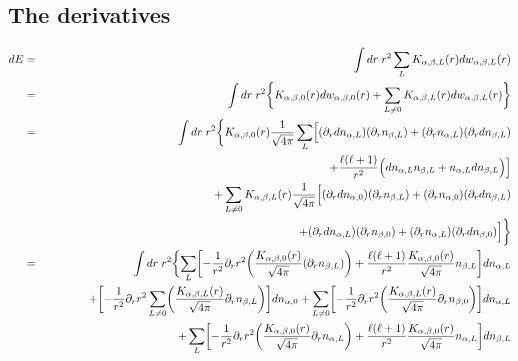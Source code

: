 \documentclass[11pt,a4paper]{report}
\begin{document}
\subsection{The derivatives}
\begin{eqnarray}
dE&=&\int dr\; r^2 \sum_LK_{\alpha,\beta,L}(r)dw_{\alpha,\beta,L}(r)
\nonumber\\
&=&\int dr\; r^2
\biggl\lbrace
 K_{\alpha,\beta,0}(r)dw_{\alpha,\beta,0}(r)
+\sum_{L\neq0} K_{\alpha,\beta,L}(r)dw_{\alpha,\beta,L}(r)
\biggr\rbrace
\nonumber\\
&=&\int dr\; r^2
\biggl\lbrace
 K_{\alpha,\beta,0}(r)\frac{1}{\sqrt{4\pi}}
\sum_L\Bigl[(\partial_r dn_{\alpha,L})(\partial_r n_{\beta,L})
+(\partial_r n_{\alpha,L})(\partial_r dn_{\beta,L})
\nonumber\\
&&\hspace{3cm}+\frac{\ell(\ell+1)}{r^2}
\Bigl(dn_{\alpha,L}n_{\beta,L}+n_{\alpha,L}dn_{\beta,L}\Bigr)
\Bigr]
\nonumber\\
&&+\sum_{L\neq0} K_{\alpha,\beta,L}(r)\frac{1}{\sqrt{4\pi}}
\Bigl[
(\partial_r dn_{\alpha,0})(\partial_r n_{\beta,L}) 
+(\partial_r n_{\alpha,0})(\partial_r dn_{\beta,L}) 
\nonumber\\
&&\hspace{3cm}+(\partial_r dn_{\alpha,L})(\partial_r n_{\beta,0}) 
+(\partial_r n_{\alpha,L})(\partial_r dn_{\beta,0}) 
\Bigr]
\biggr\rbrace
%
%
%
\nonumber\\
&=&\int dr\; r^2\biggl\lbrace
\sum_L\biggl[-\frac{1}{r^2}\partial_rr^2\biggl(
\frac{K_{\alpha,\beta,0}(r)}{\sqrt{4\pi}} (\partial_r n_{\beta,L})
\biggr) 
+
\frac{\ell(\ell+1)}{r^2}\frac{K_{\alpha,\beta,0}(r)}{\sqrt{4\pi}}n_{\beta,L}
\biggr]dn_{\alpha,L}
\nonumber\\
&&\hspace{1.3cm}
+\biggl[-\frac{1}{r^2}\partial_rr^2\sum_{L\neq0}\biggl(
\frac{K_{\alpha,\beta,L}(r)}{\sqrt{4\pi}} \partial_r n_{\beta,L}
\biggr) 
\biggr]dn_{\alpha,0}
+\sum_{L\neq0}\biggl[-\frac{1}{r^2}\partial_rr^2\biggl(
\frac{K_{\alpha,\beta,L}(r)}{\sqrt{4\pi}} \partial_r n_{\beta,0}
\biggr) 
\biggr]dn_{\alpha,L}
\nonumber\\
&&\hspace{1.3cm}+\sum_L\biggl[-\frac{1}{r^2}\partial_rr^2\biggl(
\frac{K_{\alpha,\beta,0}(r)}{\sqrt{4\pi}} \partial_r n_{\alpha,L}
\biggr) 
+
\frac{\ell(\ell+1)}{r^2}\frac{K_{\alpha,\beta,0}(r)}{\sqrt{4\pi}}n_{\alpha,L}
\biggr]dn_{\beta,L}

\end{eqnarray}
\end{document}
